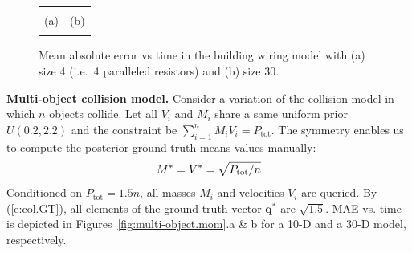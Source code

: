 \documentclass[letterpaper]{article}
\newcommand{\bvec}[1]{\textbf{#1}}
\begin{document}
\begin{figure}[t!]
\begin{center}
\begin{tabular}{cc}
\vspace{-1.5mm}
\\
\hspace{-5mm} \footnotesize(a) 
& \hspace{-4mm} \footnotesize(b) 
\\
\multicolumn{2}{c}{}
\end{tabular}
\end{center}
\vspace{-6mm}
\caption{\footnotesize 
Mean absolute error vs time in the building wiring model with (a) size 4 (i.e.\ 4 paralleled resistors) and (b) size 30.}
\label{fig:resistor}
\vspace{-2mm}
\end{figure}

\noindent
{\bf Multi-object collision model.}
Consider a variation of the collision model in which $n$ objects collide.  
Let all $V_i$ and $M_i$ share a same uniform prior $U(0.2, 2.2)$ and the constraint be $\sum_{i=1}^n{M_i V_i} = P_{\text{tot}}$. 
The symmetry enables us to compute the posterior ground truth means  values  manually:
\begin{equation}\footnotesize
\label{e:col.GT}
M^* = V^* = \sqrt{P_{\text{tot}} / n} %
\end{equation}
Conditioned on $P_{\text{tot}} = 1.5 n$, all masses $M_i$ and velocities  $V_i$ are queried. 
By (\ref{e:col.GT}), all elements of the ground truth vector $\bvec{q}^*$ are $\sqrt{1.5}$.
%
MAE vs. time is depicted in Figures~\ref{fig:multi-object.mom}.a \& b for a 10-D and a 30-D model, respectively.
\end{document}
